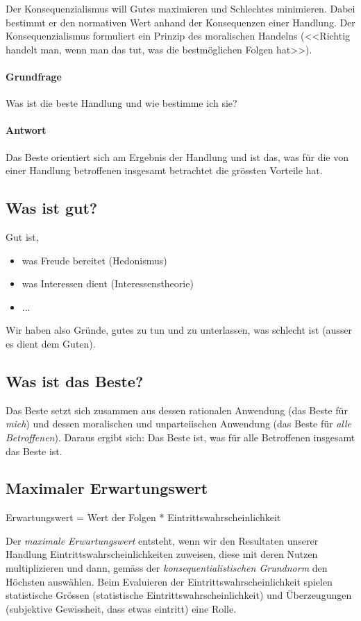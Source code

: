 \documentclass[../main.tex]{subfiles}
\begin{document}
\begin{warningbox}
Der Konsequenzialismus will Gutes maximieren und Schlechtes minimieren. Dabei bestimmt er den normativen Wert anhand der Konsequenzen einer Handlung. Der Konsequenzialismus formuliert ein Prinzip des moralischen Handelns (<<Richtig handelt man, wenn man das tut, was die bestmöglichen Folgen hat>>).
\end{warningbox}

\paragraph{Grundfrage} Was ist die beste Handlung und wie bestimme ich sie?

\paragraph{Antwort} Das Beste orientiert sich am Ergebnis der Handlung und ist das, was für die von einer Handlung betroffenen insgesamt betrachtet die grössten Vorteile hat.

\subsection{Was ist gut?}
Gut ist, 
\begin{itemize}
  \item was Freude bereitet (Hedonismus)
  \item was Interessen dient (Interessenstheorie)
  \item ...
\end{itemize}
Wir haben also Gründe, gutes zu tun und zu unterlassen, was schlecht ist (ausser es dient dem Guten).

\subsection{Was ist das Beste?}
Das Beste setzt sich zusammen aus dessen rationalen Anwendung (das Beste für \textit{mich}) und dessen moralischen und unparteiischen Anwendung (das Beste für \textit{alle Betroffenen}). Daraus ergibt sich: Das Beste ist, was für alle Betroffenen insgesamt das Beste ist. 

\subsection{Maximaler Erwartungswert}
\begin{infobox}
Erwartungswert = Wert der Folgen * Eintrittswahrscheinlichkeit
\end{infobox}
Der \textit{maximale Erwartungswert} entsteht, wenn wir den Resultaten unserer Handlung Eintrittswahrscheinlichkeiten zuweisen, diese mit deren Nutzen multiplizieren und dann, gemäss der \textit{konsequentialistischen Grundnorm} den Höchsten auswählen. Beim Evaluieren der Eintrittswahrscheinlichkeit spielen statistische Grössen (statistische Eintrittswahrscheinlichkeit) und Überzeugungen (subjektive Gewissheit, dass etwas eintritt) eine Rolle. 
\end{document}
